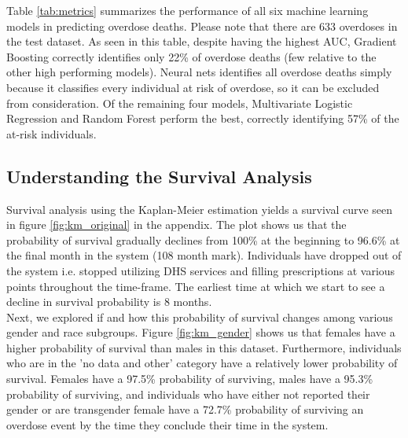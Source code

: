 \documentclass[twoside,10.5pt]{article}
\begin{document}
Table \ref{tab:metrics} summarizes the performance of all six machine learning models in predicting overdose deaths. Please note that there are 633 overdoses in the test dataset. As seen in this table, despite having the highest AUC, Gradient Boosting correctly identifies only 22\% of overdose deaths (few relative to the other high performing models). Neural nets identifies all overdose deaths simply because it classifies every individual at risk of overdose, so it can be excluded from consideration. Of the remaining four models, Multivariate Logistic Regression and Random Forest perform the best, correctly identifying 57\% of the at-risk individuals. 

\subsection{Understanding the Survival Analysis}
Survival analysis using the Kaplan-Meier estimation yields a survival curve seen in figure \ref{fig:km_original} in the appendix. The plot shows us that the probability of survival gradually declines from 100\% at the beginning to 96.6\% at the final month in the system (108 month mark). Individuals have dropped out of the system i.e. stopped utilizing DHS services and filling prescriptions at various points throughout the time-frame. The earliest time at which we start to see a decline in survival probability is 8 months.\\

Next, we explored if and how this probability of survival changes among various gender and race subgroups. Figure \ref{fig:km_gender} shows us that females have a higher probability of survival than males in this dataset. Furthermore, individuals who are in the 'no data and other' category have a relatively lower probability of survival. Females have a 97.5\% probability of surviving, males have a 95.3\% probability of surviving, and individuals who have either not reported their gender or are transgender female have a 72.7\% probability of surviving an overdose event by the time they conclude their time in the system. \\
\end{document}
